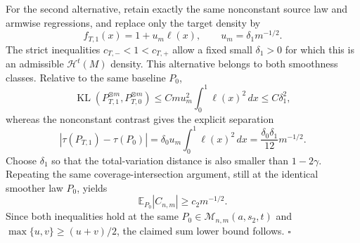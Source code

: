 For the second alternative, retain exactly the same nonconstant source law and armwise regressions, and replace only the target density by
\[
 f_{T,1}(x)=1+u_m\ell(x),
 \qquad
 u_m=\delta_1m^{-1/2}.
\]
The strict inequalities \(c_{T,-}<1<c_{T,+}\) allow a fixed small \(\delta_1>0\) for which this is an admissible \(\mathcal H^t(M)\) density.  This alternative belongs to both smoothness classes.  Relative to the same baseline \(P_0\),
\[
 \operatorname{KL}(P_{T,1}^{\otimes m},P_{T,0}^{\otimes m})
 \le Cmu_m^2\int_0^1\ell(x)^2\,dx
 \le C\delta_1^2,
\]
whereas the nonconstant contrast gives the explicit separation
\[
 |\tau(P_{T,1})-\tau(P_0)|
 =\delta_0u_m\int_0^1\ell(x)^2\,dx
 =\frac{\delta_0\delta_1}{12}m^{-1/2}.
\]
Choose \(\delta_1\) so that the total-variation distance is also smaller than \(1-2\gamma\).  Repeating the same coverage-intersection argument, still at the identical smoother law \(P_0\), yields
\[
 \mathbb E_{P_0}|C_{n,m}|\ge c_2m^{-1/2}.
\]
Since both inequalities hold at the same \(P_0\in\mathcal M_{n,m}(a,s_2,t)\) and \(\max\{u,v\}\ge(u+v)/2\), the claimed sum lower bound follows. \(\square\)